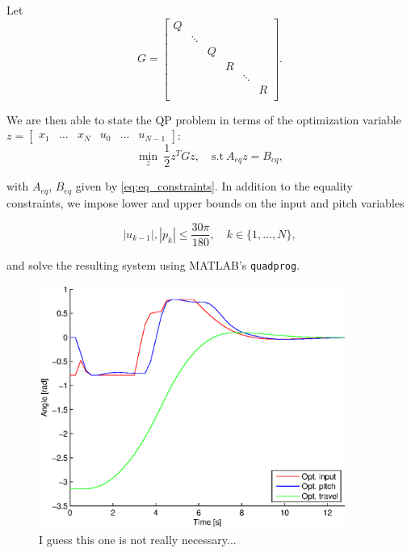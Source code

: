 Let 
\begin{equation*}
	G =
	\begin{bmatrix}
	Q	&&&&&		\\
		&\ddots&&&&	\\
		&&Q&&&		\\
		&&&R&&		\\
		&&&&\ddots&	\\
		&&&&&R		\\
	\end{bmatrix}.
\end{equation*}

 We are then able to state the QP problem in terms of the optimization variable $z = \begin{bmatrix} x_1 & \dots & x_N & u_0 & \dots & u_{N-1} \end{bmatrix}$:
\begin{equation*}
	\min_z \ \frac{1}{2} z^T G z, \quad \textrm{s.t}\ A_{eq} z = B_{eq},
\end{equation*}

with $A_{eq}$, $B_{eq}$ given by \eqref{eq:eq_constraints}. In addition to the equality constraints, we impose lower and upper bounds on the input and pitch variables

\begin{equation*}
	|u_{k-1}|, |p_k| \le \frac{30 \pi}{180}, \quad k \in \{1, \dots, N\},
\end{equation*}

and solve the resulting system using MATLAB's \texttt{quadprog}.

\begin{figure}[hp]
	\centering
		\includegraphics[width=0.9\textwidth]{figures/2/opt_traj.eps}
	\caption{I guess this one is not really necessary...}
	\label{fig:opt_traj}
\end{figure}

